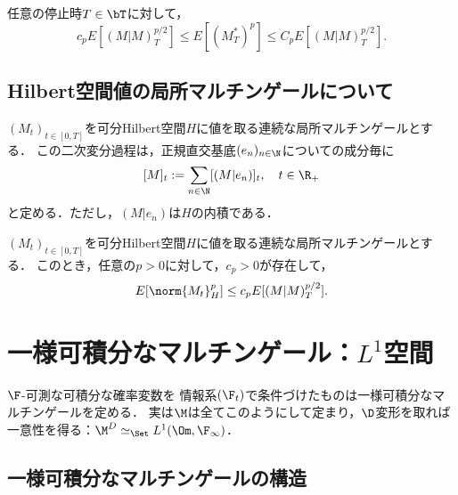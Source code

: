 \documentclass[uplatex,dvipdfmx]{jsreport}
\begin{document}
\begin{corollary}
    任意の停止時$T\in\bT$に対して，
    \[c_pE[(M|M)^{p/2}_T]\le E[(M^*_T)^p]\le C_pE[(M|M)^{p/2}_T].\]
\end{corollary}

\subsection{Hilbert空間値の局所マルチンゲールについて}

\begin{definition}
    $(M_t)_{t\in[0,T]}$を可分Hilbert空間$H$に値を取る連続な局所マルチンゲールとする．
    この二次変分過程は，正規直交基底$(e_n)_{n\in\N}$についての成分毎に
    \[[M]_t:=\sum_{n\in\N}[(M|e_n)]_t,\quad t\in\R_+\]
    と定める．ただし，$(M|e_n)$は$H$の内積である．
\end{definition}

\begin{theorem}
    $(M_t)_{t\in[0,T]}$を可分Hilbert空間$H$に値を取る連続な局所マルチンゲールとする．
    このとき，任意の$p>0$に対して，$c_p>0$が存在して，
    \[E[\norm{M_t}^p_H]\le c_pE[(M|M)_T^{p/2}].\]
\end{theorem}

\section{一様可積分なマルチンゲール：$L^1$空間}

\begin{tcolorbox}[colframe=ForestGreen, colback=ForestGreen!10!white,breakable,colbacktitle=ForestGreen!40!white,coltitle=black,fonttitle=\bfseries\sffamily,
title=]
    $\F$-可測な可積分な確率変数を
    情報系$(\F_t)$で条件づけたものは一様可積分なマルチンゲールを定める．
    実は$\M$は全てこのようにして定まり，$\D$変形を取れば一意性を得る：$\M^D\simeq_\Set L^1(\Om,\F_\infty)$．
\end{tcolorbox}

\subsection{一様可積分なマルチンゲールの構造}
\end{document}
